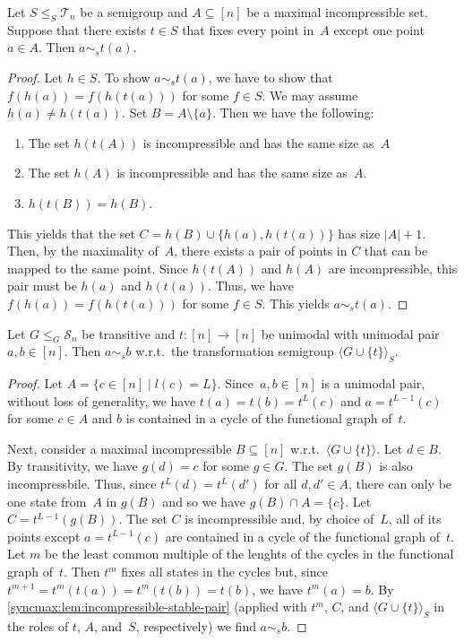 \begin{lemma} \label{syncmax:lem:incompressible-stable-pair}
	Let $S \le_S \mathcal T_n$ be a semigroup and $A \subseteq [n]$
	be a maximal incompressible set.
	Suppose that there exists $t \in S$ that fixes every point in~$A$
	except one point $a \in A$. Then $a \sim_s t(a)$.
\end{lemma}
\begin{proof}
	Let $h \in S$. To show $a \sim_s t(a)$, we have to show that $f(h(a)) = f(h(t(a)))$
	for some $f \in S$.
	We may assume $h(a) \ne h(t(a))$.
	Set $B = A \setminus \{a\}$. Then we have the following:	
	\begin{enumerate}
		\item The set $h(t(A))$ is incompressible and has the same size as~$A$
		
		\item The set $h(A)$ is incompressible and has the same size as~$A$.
		
		\item $h(t(B)) = h(B)$.
	\end{enumerate}
	This yields that the set $C = h(B) \cup \{ h(a), h(t(a)) \}$
	has size $|A| + 1$.	
	Then, by the maximality of~$A$, there exists a pair of points in $C$ that can be mapped to the same point. Since $h(t(A))$ and $h(A)$ are incompressible, this pair must be $h(a)$ and $h(t(a))$.	
	Thus, we have $f(h(a)) = f(h(t(a)))$ for some $f \in S$.
	This yields $a \sim_s t(a)$.
\end{proof}

\begin{lemma} \label{syncmax:lem:unimodal-stable}
	Let $G \le_G \mathcal S_n$ be transitive
	and $t \colon [n] \to [n]$ be unimodal 
	with unimodal pair $a,b \in [n]$.
	Then $a \sim_s b$ w.r.t.~the transformation semigroup $\langle G \cup \{t\} \rangle_S$.
\end{lemma}
\begin{proof}
	Let $A = \{ c \in [n] \mid l(c) = L \}$.
	Since~$a, b \in [n]$ is a unimodal pair, without loss of generality,
	we have $t(a) = t(b) = t^L(c)$ and $a = t^{L-1}(c)$
	for some $c \in A$ and $b$ is contained in a cycle
	of the functional graph of~$t$.
	
	Next, consider a maximal incompressible $B \subseteq [n]$
	w.r.t.~$\langle G \cup \{t\} \rangle$.
	Let $d \in B$.
	By transitivity, we have $g(d) = c$ for some $g \in G$.
	The set $g(B)$ is also incompressbile.
	Thus, since $t^L(d) = t^L(d')$ for all $d,d' \in A$,
	there can only be one state from~$A$ in $g(B)$
	and so we have $g(B) \cap A = \{ c \}$.
	Let $C = t^{L - 1}(g(B))$.
	The set $C$ is incompressible and, by choice of~$L$,
	all of its points except $a = t^{L - 1}(c)$
	are contained in a cycle of the functional graph of~$t$.
	Let $m$ be the least common multiple of the lenghts
	of the cycles in the functional graph of~$t$.
	Then $t^m$ fixes all states in the cycles
	but, since $t^{m + 1} = t^m(t(a)) = t^m(t(b)) = t(b)$,
	we have	$t^m(a) = b$.
	By \cref{syncmax:lem:incompressible-stable-pair} (applied with $t^m$, $C$, and $\langle G \cup \{t\} \rangle_S$
	in the roles of $t$, $A$, and~$S$, respectively)
	we find $a \sim_s b$.	
\end{proof}

